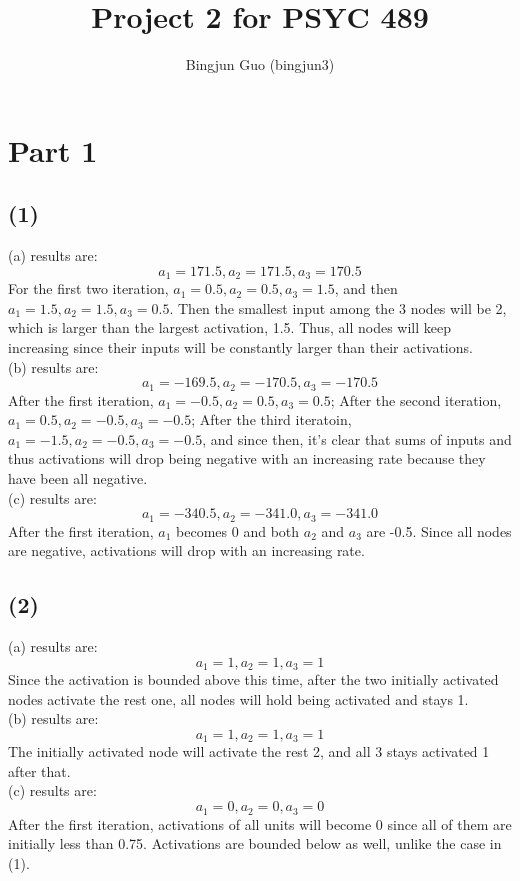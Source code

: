 \documentclass{article}
\title{Project 2 for PSYC 489}
\author{Bingjun Guo (bingjun3)}
\begin{document}
\maketitle
\section*{Part 1}
\subsection*{(1)}
\hspace{\parindent}(a) results are:
\[a_1 = 171.5, a_2 = 171.5, a_3 = 170.5\]
For the first two iteration, $a_1 = 0.5, a_2 = 0.5, a_3 = 1.5$, and then
$a_1 = 1.5, a_2 = 1.5, a_3 = 0.5$. Then the smallest input among the 3
nodes will be 2, which is larger than the largest activation, 1.5.
Thus, all nodes will keep increasing since their inputs will be constantly 
larger than their activations.\\

(b) results are:
\[a_1 = -169.5, a_2 = -170.5, a_3 = -170.5\]
After the first iteration, $a_1 = -0.5, a_2 = 0.5, a_3 = 0.5$; After the 
second iteration, $a_1 = 0.5, a_2 = -0.5, a_3 = -0.5$; After the third
iteratoin, $a_1 = -1.5, a_2 = -0.5, a_3 = -0.5$, and since then, it's
clear that sums of inputs and thus activations will drop being negative
with an increasing rate because they have been all negative.\\

(c) results are:
\[a_1 = -340.5, a_2 = -341.0, a_3 = -341.0\]
After the first iteration, $a_1$ becomes 0 and both $a_2$ and $a_3$ are -0.5.
Since all nodes are negative, activations will drop with an increasing rate.

\subsection*{(2)}
\hspace{\parindent}(a) results are:
\[a_1 = 1, a_2 = 1, a_3 = 1\]
Since the activation is bounded above this time, after the two initially
activated nodes activate the rest one, all nodes will hold being
activated and stays 1.\\

(b) results are:
\[a_1 = 1, a_2 = 1, a_3 = 1\]
The initially activated node will activate the rest 2, and all 3 stays 
activated 1 after that.\\

(c) results are:
\[a_1 = 0, a_2 = 0, a_3 = 0\]
After the first iteration, activations of all units will become 0 since
all of them are initially less than 0.75. Activations are bounded below
as well, unlike the case in (1).
\end{document}
